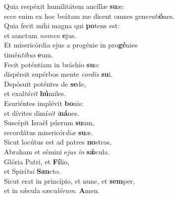 \oddverse Quia respéxit humilitátem ancíllæ \textbf{su}æ:~\*\\
\oddverse ecce enim ex hoc beátam me dicent omnes gene\textit{ra}\textit{ti}\textbf{ó}nes.\\
\evenverse Quia fecit mihi magna qui \textbf{po}tens est:~\*\\
\evenverse et sanctum \textit{no}\textit{men} \textbf{e}jus.\\
\oddverse Et misericórdia ejus a progénie in pro\textbf{gé}nies~\*\\
\oddverse timén\textit{ti}\textit{bus} \textbf{e}um.\\
\evenverse Fecit poténtiam in bráchio \textbf{su}o:~\*\\
\evenverse dispérsit supérbos mente \textit{cor}\textit{dis} \textbf{su}i.\\
\oddverse Depósuit poténtes de \textbf{se}de,~\*\\
\oddverse et exal\textit{tá}\textit{vit} \textbf{hú}miles.\\
\evenverse Esuriéntes implévit \textbf{bo}nis:~\*\\
\evenverse et dívites dimí\textit{sit} \textit{i}\textbf{ná}nes.\\
\oddverse Suscépit Israël púerum \textbf{su}um,~\*\\
\oddverse recordátus misericór\textit{di}\textit{æ} \textbf{su}æ.\\
\evenverse Sicut locútus est ad patres \textbf{no}stros,~\*\\
\evenverse Abraham et sémini e\textit{jus} \textit{in} \textbf{sǽ}cula.\\
\oddverse Glória Patri, et \textbf{Fí}lio,~\*\\
\oddverse et Spirí\textit{tu}\textit{i} \textbf{San}cto.\\
\evenverse Sicut erat in princípio, et nunc, et \textbf{sem}per,~\*\\
\evenverse et in sǽcula sæcu\textit{ló}\textit{rum}. \textbf{A}men.\\
